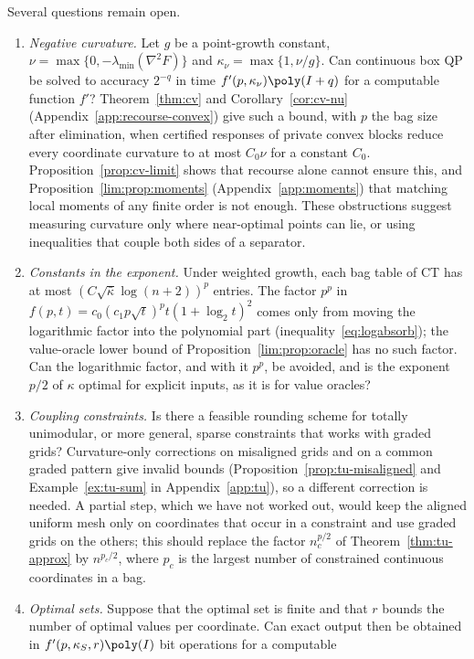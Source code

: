 Several questions remain open.
\begin{enumerate}[label=(\arabic*)]
\item \emph{Negative curvature.} Let $g$ be a point-growth constant,
$\nu=\max\{0,-\lambda_{\min}(\nabla^2F)\}$ and $\kappa_\nu=\max\{1,\nu/g\}$.
Can continuous box QP be solved to accuracy $2^{-q}$ in time
$f'(p,\kappa_\nu)\poly(I+q)$ for a computable function $f'$?
Theorem~\ref{thm:cv} and Corollary~\ref{cor:cv-nu}
(Appendix~\ref{app:recourse-convex}) give such a bound, with $p$ the bag size
after elimination, when certified responses of private convex blocks reduce
every coordinate curvature to at most $C_0\nu$ for a constant $C_0$.
Proposition~\ref{prop:cv-limit} shows that recourse alone cannot ensure this,
and Proposition~\ref{lim:prop:moments} (Appendix~\ref{app:moments}) that
matching local moments of any finite order is not enough. These obstructions
suggest measuring curvature only where near-optimal points can lie, or using
inequalities that couple both sides of a separator.
\item \emph{Constants in the exponent.} Under weighted growth, each bag
table of CT has at most $(C\sqrt{\bar\kappa}\log(n+2))^p$ entries. The factor
$p^p$ in $f(p,t)=c_0(c_1p\sqrt t)^pt(1+\log_2t)^2$ comes only from moving the
logarithmic factor into the polynomial part (inequality~\eqref{eq:logabsorb});
the value-oracle lower bound of Proposition~\ref{lim:prop:oracle} has no such
factor. Can the logarithmic factor, and with it $p^p$, be avoided, and is the
exponent $p/2$ of $\kappa$ optimal for explicit inputs, as it is for value
oracles?
\item \emph{Coupling constraints.} Is there a feasible rounding scheme for
totally unimodular, or more general, sparse constraints that works with
graded grids? Curvature-only corrections on misaligned grids and on a common
graded pattern give invalid bounds (Proposition~\ref{prop:tu-misaligned} and
Example~\ref{ex:tu-sum} in Appendix~\ref{app:tu}), so a different correction
is needed. A partial step, which we have not worked out, would keep the
aligned uniform mesh only on coordinates that occur in a constraint and use
graded grids on the others; this should replace the factor $n_c^{p/2}$ of
Theorem~\ref{thm:tu-approx} by $n^{p_c/2}$, where $p_c$ is the largest number
of constrained continuous coordinates in a bag.
\item \emph{Optimal sets.} Suppose that the optimal set is finite and that
$r$ bounds the number of optimal values per coordinate. Can exact output then
be obtained in $f'(p,\kappa_S,r)\poly(I)$ bit operations for a computable

\end{enumerate}
